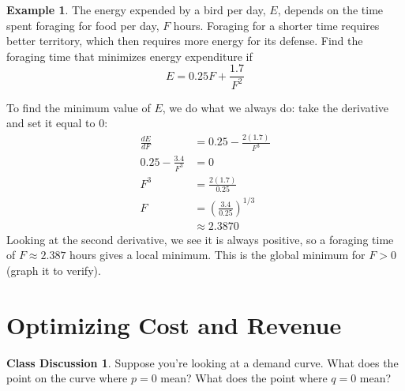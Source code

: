 \documentclass[oneside]{book}
\newcommand{\deriv}[2]{\frac{d#1}{d#2}}
\theoremstyle{definition}
\newtheorem{example}{Example}
\newtheorem*{discussion}{Class Discussion}
\theoremstyle{solution}
\newtheorem*{solution}{Solution}
\newenvironment{solution}{\vspace{2in}\comment}{\endcomment}
\begin{document}
\begin{example}
  The energy expended by a bird per day, $E$, depends on the time
  spent foraging for food per day, $F$ hours. Foraging for a shorter
  time requires better territory, which then requires more energy for
  its defense. Find the foraging time that minimizes energy
  expenditure if
  $$ 
  E = 0.25F + \frac{1.7}{F^2}
  $$
\end{example}

\begin{solution}
  To find the minimum value of $E$, we do what we always do: take the derivative and set it equal to $0$:
  \begin{align*}
    \deriv{E}{F}              & = 0.25 - \frac{2(1.7)}{F^3}           \\
    0.25 - \frac{3.4}{F^3} & = 0                                   \\
    F^3                    & = \frac{2(1.7)}{0.25}                 \\
    F                      & = \left(\frac{3.4}{0.25}\right)^{1/3} \\
                           & \approx 2.3870
  \end{align*}
  Looking at the second derivative, we see it is always positive, so a
  foraging time of $F \approx 2.387$ hours gives a local minimum.
  This is the global minimum for $F > 0$ (graph it to verify).
\end{solution}

\section{Optimizing Cost and Revenue}

\begin{discussion}
  Suppose you're looking at a demand curve.  What does the point on
  the curve where $p=0$ mean?  What does the point where $q=0$ mean?
\end{discussion}
\end{document}
